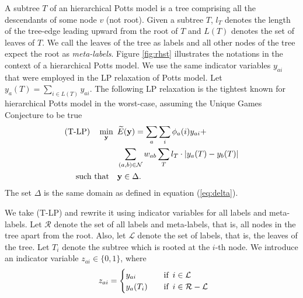 \vspace{2mm}
%
A subtree $T$ of an hierarchical Potts model is a tree comprising all the descendants of some node $v$ (not root). Given a subtree $T$, $l_T$ denotes the length of the tree-edge leading upward from the root of $T$ and $L(T)$ denotes the set of leaves of $T$. We call the leaves of the tree as labels and all other nodes of the tree expect the root as \emph{meta-labels}. Figure \ref{fig:rhst} illustrates the notations in the context of a hierarchical Potts model.
%
 We use the same indicator variables $y_{ai}$ that were employed in the LP relaxation of Potts model. Let $y_a(T) = \sum_{i \in L(T)} y_{ai}$. The following LP relaxation is the tightest known for hierarchical Potts model in the worst-case, assuming the Unique Games Conjecture to be true \citep{manokaran2008sdp}
\begin{align}
\text{(T-LP)} \quad \min_{\bf y} \enskip & \widetilde{E}({\bf y}) =  \sum_{a} \sum_{i} \phi_a(i)y_{ai} + \nonumber\\
                                         &\sum_{(a, b) \in {\mathcal N}} w_{ab} \sum_T l_T \cdot |y_{a}(T) - y_{b}(T)| \nonumber\\
    \text{such that} \quad &{\bf y} \in \Delta.
\label{eq:t-lp}
\end{align}
The set $\Delta$ is the same domain as defined in equation (\ref{eq:delta}). 

 We take (T-LP) and rewrite it using indicator variables for all labels and meta-labels. Let $\mathcal R$ denote the set of all labels and meta-labels, that is, all nodes in the tree apart from the root. Also, let $\mathcal L$ denote the set of labels, that is, the leaves of the tree. Let $T_i$ denote the subtree which is rooted at the $i$-th node. We introduce an indicator variable $z_{ai} \in \{0, 1\}$, where
\begin{align}
    \enskip  z_{ai} =  \begin{cases} 
        y_{ai} \quad &\text{if} \enskip i \in {\mathcal L} \\
        y_{a}(T_i) \quad &\text{if} \enskip i \in {\mathcal R - \mathcal L} \\
    \end{cases}
\end{align}

